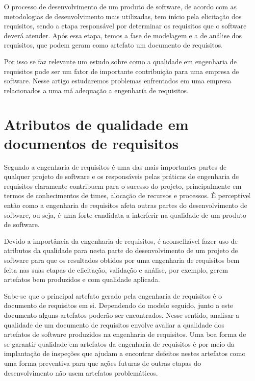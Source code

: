 \documentclass[12pt]{article}
\begin{document}
O processo de desenvolvimento de um produto de software, de acordo com as metodologias de 
desenvolvimento mais utilizadas, tem início pela elicitação dos requisitos, sendo a etapa 
responsável por determinar os requisitos que o software deverá atender. Após essa etapa, 
temos a fase de modelagem e a de análise dos requisitos, que podem geram como artefato um 
documento de requisitos.

Por isso se faz relevante um estudo sobre como a qualidade em engenharia de requisitos 
pode ser um fator de importante contribuição para uma empresa de software. Nesse artigo 
estudaremos problemas enfrentados em uma empresa relacionados a uma má adequação a 
engenharia de requisitos.

\section{Atributos de qualidade em documentos de requisitos}

Segundo \cite{hofmann:2001} a engenharia de requisitos é uma das mais importantes 
partes de qualquer projeto de software e os responsáveis pelas práticas de engenharia de 
requisitos claramente contribuem para o sucesso do projeto, principalmente em termos de 
conhecimentos de times, alocação de recursos e processos. É perceptível então como a 
engenharia de requisitos afeta outras partes do desenvolvimento de software, ou seja, é 
uma forte candidata a interferir na qualidade de um produto de software.

Devido a importância da engenharia de requisitos, é aconselhável fazer uso de atributos
da qualidade para nesta parte do desenvolvimento de um projeto de software para que os 
resultados obtidos por uma engenharia de requisitos bem feita nas suas etapas de elicitação, 
validação e análise, por exemplo, gerem artefatos bem produzidos e com qualidade aplicada.

Sabe-se que o principal artefato gerado pela engenharia de requisitos é o documento de 
requisitos em si. Dependendo do modelo seguido, junto a este documento alguns artefatos 
poderão ser encontrados. Nesse sentido, analisar a qualidade de um documento de requisitos 
envolve avaliar a qualidade dos artefatos de software produzidos na engenharia de requisitos. 
Uma boa forma de se garantir qualidade em artefatos da engenharia de requisitos é por meio da 
implantação de inspeções que ajudam a encontrar defeitos nestes artefatos como uma forma 
preventiva para que ações futuras de outras etapas do desenvolvimento não usem artefatos 
problemáticos.
\end{document}
